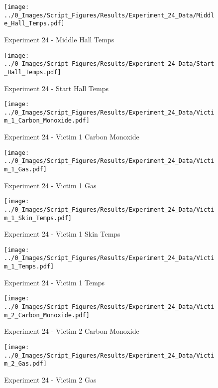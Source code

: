 	\begin{figure}[H]
		\centering
		\texttt{[image: ../0\_Images/Script\_Figures/Results/Experiment\_24\_Data/Middle\_Hall\_Temps.pdf]}
		\caption[]{Experiment 24 - Middle Hall Temps}
	\end{figure}
 
	\clearpage

	\begin{figure}[H]
		\centering
		\texttt{[image: ../0\_Images/Script\_Figures/Results/Experiment\_24\_Data/Start\_Hall\_Temps.pdf]}
		\caption[]{Experiment 24 - Start Hall Temps}
	\end{figure}
 

	\begin{figure}[H]
		\centering
		\texttt{[image: ../0\_Images/Script\_Figures/Results/Experiment\_24\_Data/Victim\_1\_Carbon\_Monoxide.pdf]}
		\caption[]{Experiment 24 - Victim 1 Carbon Monoxide}
	\end{figure}
 
	\clearpage

	\begin{figure}[H]
		\centering
		\texttt{[image: ../0\_Images/Script\_Figures/Results/Experiment\_24\_Data/Victim\_1\_Gas.pdf]}
		\caption[]{Experiment 24 - Victim 1 Gas}
	\end{figure}
 

	\begin{figure}[H]
		\centering
		\texttt{[image: ../0\_Images/Script\_Figures/Results/Experiment\_24\_Data/Victim\_1\_Skin\_Temps.pdf]}
		\caption[]{Experiment 24 - Victim 1 Skin Temps}
	\end{figure}
 
	\clearpage

	\begin{figure}[H]
		\centering
		\texttt{[image: ../0\_Images/Script\_Figures/Results/Experiment\_24\_Data/Victim\_1\_Temps.pdf]}
		\caption[]{Experiment 24 - Victim 1 Temps}
	\end{figure}
 

	\begin{figure}[H]
		\centering
		\texttt{[image: ../0\_Images/Script\_Figures/Results/Experiment\_24\_Data/Victim\_2\_Carbon\_Monoxide.pdf]}
		\caption[]{Experiment 24 - Victim 2 Carbon Monoxide}
	\end{figure}
 
	\clearpage

	\begin{figure}[H]
		\centering
		\texttt{[image: ../0\_Images/Script\_Figures/Results/Experiment\_24\_Data/Victim\_2\_Gas.pdf]}
		\caption[]{Experiment 24 - Victim 2 Gas}
	\end{figure}
 

